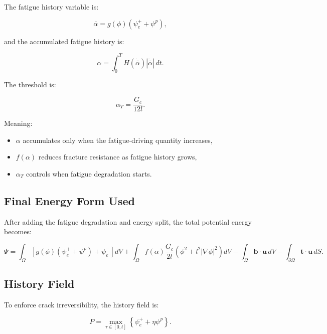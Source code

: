 \documentclass[11pt,a4paper]{article}
\begin{document}
The fatigue history variable is:

\begin{equation}
\bar{\alpha}
=
g(\phi)
\left(
\psi_e^+ + \psi^p
\right),
\end{equation}

and the accumulated fatigue history is:

\begin{equation}
\alpha =
\int_0^T
H(\dot{\bar{\alpha}})
|\dot{\bar{\alpha}}|\,dt .
\end{equation}

The threshold is:

\begin{equation}
\alpha_T = \frac{G_c}{12l}.
\end{equation}

Meaning:

\begin{itemize}
    \item $\alpha$ accumulates only when the fatigue-driving quantity increases,
    \item $f(\alpha)$ reduces fracture resistance as fatigue history grows,
    \item $\alpha_T$ controls when fatigue degradation starts.
\end{itemize}

\subsection{Final Energy Form Used}

After adding the fatigue degradation and energy split, the total potential energy becomes:

\begin{equation}
\Psi =
\int_{\Omega}
\left[
 g(\phi)(\psi_e^+ + \psi^p)
+
\psi_e^-
\right] dV
+
\int_{\Omega}
 f(\alpha)
\frac{G_c}{2l}
\left(
\phi^2 + l^2|\nabla \phi|^2
\right)dV
-
\int_{\Omega}\bm{b}\cdot \bm{u}\,dV
-
\int_{\partial\Omega}\bm{t}\cdot \bm{u}\,dS .
\end{equation}

\subsection{History Field}

To enforce crack irreversibility, the history field is:

\begin{equation}
P =
\max_{\tau \in [0,t]}
\left\{
\psi_e^+ + \eta \psi^p
\right\}.
\end{equation}
\end{document}
